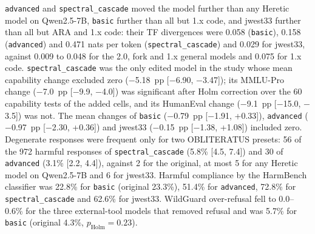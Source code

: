 \texttt{advanced} and \texttt{spectral\_cascade} moved the model further than any Heretic model on Qwen2.5-7B,
\texttt{basic} further than all but 1.x code, and jwest33 further than all but ARA and 1.x code: their TF
divergences were 0.058 (\texttt{basic}), 0.158 (\texttt{advanced}) and 0.471 nats per token
(\texttt{spectral\_cascade}) and 0.029 for jwest33, against 0.009 to 0.048 for the 2.0, fork and 1.x general models
and 0.075 for 1.x code. \texttt{spectral\_cascade} was the only edited model in the study whose mean capability change
excluded zero ($-$5.18~pp [$-$6.90, $-$3.47]); its MMLU-Pro change ($-$7.0~pp [$-$9.9, $-$4.0]) was significant after
Holm correction over the 60 capability tests of the added cells, and its HumanEval change ($-$9.1~pp [$-$15.0,
$-$3.5]) was not. The mean changes of \texttt{basic} ($-$0.79~pp [$-$1.91, +0.33]), \texttt{advanced} ($-$0.97~pp
[$-$2.30, +0.36]) and jwest33 ($-$0.15~pp [$-$1.38, +1.08]) included zero. Degenerate responses were frequent only
for two OBLITERATUS presets: 56 of the 972 harmful responses of \texttt{spectral\_cascade} (5.8\% [4.5, 7.4]) and 30
of \texttt{advanced} (3.1\% [2.2, 4.4]), against 2 for the original, at most 5 for any Heretic model on Qwen2.5-7B and
6 for jwest33. Harmful compliance by the HarmBench classifier was 22.8\% for \texttt{basic} (original 23.3\%), 51.4\%
for \texttt{advanced}, 72.8\% for \texttt{spectral\_cascade} and 62.6\% for jwest33. WildGuard over-refusal fell to
0.0--0.6\% for the three external-tool models that removed refusal and was 5.7\% for \texttt{basic} (original 4.3\%,
$p_\mathrm{Holm}=0.23$).

